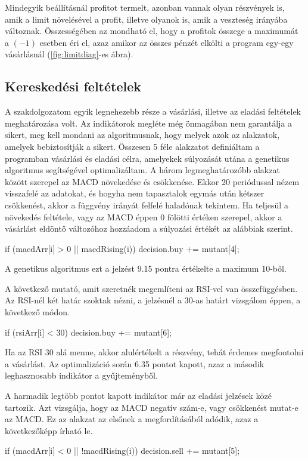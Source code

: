 Mindegyik beállításnál profitot termelt, azonban vannak olyan részvények is, amik a limit növelésével a profit, illetve olyanok is, amik a veszteség irányába változnak. Összességében az mondható el, hogy a profitok összege a maximumát a $(-1)$ esetben éri el, azaz amikor az összes pénzét elkölti a program egy-egy vásárlásnál (\ref{fig:limitdiag}-es ábra).

\subsection{Kereskedési feltételek}
A szakdolgozatom egyik legnehezebb része a vásárlási, illetve az eladási feltételek meghatározása volt. Az indikátorok megléte még önmagában nem garantálja a sikert, meg kell mondani az algoritmusnak, hogy melyek azok az alakzatok, amelyek bebiztosítják a sikert. Összesen 5 féle alakzatot definiáltam a programban vásárlási és eladási célra, amelyekek súlyozását utána a genetikus algoritmus segítségével optimalizáltam. A három legmeghatározóbb alakzat között szerepel az MACD növekedése és csökkenése. Ekkor 20 periódussal nézem visszafelé az adatokat, és hogyha nem tapasztalok egymás után kétszer csökkenést, akkor a függvény irányát felfelé haladónak tekintem. Ha teljesül a növekedés feltétele, vagy az MACD éppen 0 fölötti értéken szerepel, akkor a vásárlást eldöntő változóhoz hozzáadom a súlyozási értékét az alábbiak szerint.
\begin{javascript}
if (macdArr[i] > 0 || macdRising(i)) {
    decision.buy += mutant[4];
}
\end{javascript}
A genetikus algoritmus ezt a jelzést 9.15 pontra értékelte a maximum 10-ből.

A következő mutató, amit szeretnék megemlíteni az RSI-vel van összefüggésben. Az RSI-nél két határ szoktak nézni, a jelzésnél a 30-as határt vizsgálom éppen, a következő módon.
\begin{javascript}
if (rsiArr[i] < 30) {
    decision.buy += mutant[6];
}
\end{javascript}
Ha az RSI 30 alá menne, akkor alulértékelt a részvény, tehát érdemes megfontolni a vásárlást. Az optimalizáció során 6.35 pontot kapott, azaz a második leghasznosabb indikátor a gyűjteményből.

A harmadik legtöbb pontot kapott indikátor már az eladási jelzések közé tartozik. Azt vizsgálja, hogy az MACD negatív szám-e, vagy csökkenést mutat-e az MACD. Ez az alakzat az elsőnek a megfordításából adódik, azaz a következőképp írható le.
\begin{javascript}
if (macdArr[i] < 0 || !macdRising(i)) {
    decision.sell += mutant[5];
}
\end{javascript}

